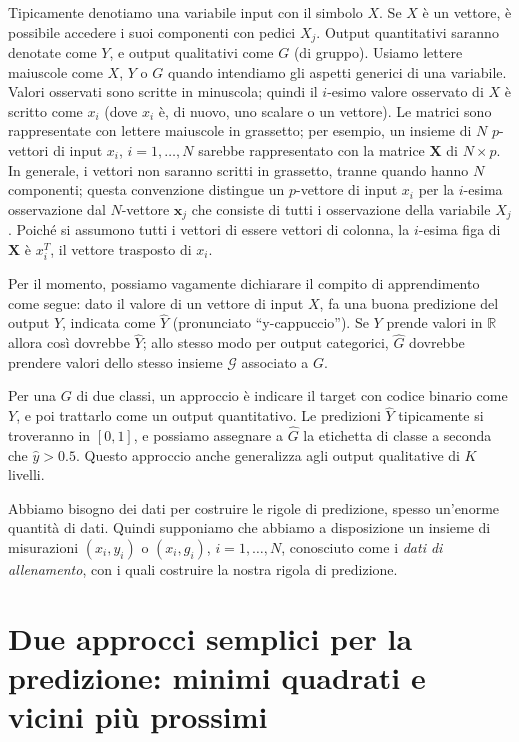 \documentclass[11pt,openany]{book}
\begin{document}
Tipicamente denotiamo una variabile input con il simbolo $X$. Se $X$ è un vettore, è possibile accedere i suoi componenti con pedici $X_j$. Output quantitativi saranno denotate come $Y$, e output qualitativi come $G$ (di gruppo). Usiamo lettere maiuscole come $X$, $Y$ o $G$ quando intendiamo gli aspetti generici di una variabile. Valori osservati sono scritte in minuscola; quindi il $i$-esimo valore osservato di $X$ è scritto come $x_i$ (dove $x_i$ è, di nuovo, uno scalare o un vettore). Le matrici sono rappresentate con lettere maiuscole in grassetto; per esempio, un insieme di $N$ $p$-vettori di input $x_i$, $i = 1, \dots, N$ sarebbe rappresentato con la matrice $\mathbf{X}$ di $N \times p$. In generale, i vettori non saranno scritti in grassetto, tranne quando hanno $N$ componenti; questa convenzione distingue un $p$-vettore di input $x_i$ per la $i$-esima osservazione dal $N$-vettore $\mathbf{x}_j$ che consiste di tutti i osservazione della variabile $X_j$. Poiché si assumono tutti i vettori di essere vettori di colonna, la $i$-esima figa di $\mathbf{X}$ è $x_i^T$, il vettore trasposto di $x_i$.

Per il momento, possiamo vagamente dichiarare il compito di apprendimento come segue: dato il valore di un vettore di input $X$, fa una buona predizione del output $Y$, indicata come $\hat{Y}$ (pronunciato ``y-cappuccio''). Se $Y$ prende valori in $\mathbb{R}$ allora così dovrebbe $\hat{Y}$; allo stesso modo per output categorici, $\hat{G}$ dovrebbe prendere valori dello stesso insieme $\mathcal{G}$ associato a $G$.

Per una $G$ di due classi, un approccio è indicare il target con codice binario come $Y$, e poi trattarlo come un output quantitativo. Le predizioni $\hat{Y}$ tipicamente si troveranno in $[0, 1]$, e possiamo assegnare a $\hat{G}$ la etichetta di classe a seconda che $\hat{y} > 0.5$. Questo approccio anche generalizza agli output qualitative di $K$ livelli.

Abbiamo bisogno dei dati per costruire le rigole di predizione, spesso un'enorme quantità di dati. Quindi supponiamo che abbiamo a disposizione un insieme di misurazioni $(x_i, y_i)$ o $(x_i, g_i)$, $i = 1, \dots, N$, conosciuto come i {\it dati di allenamento}, con i quali costruire la nostra rigola di predizione.

\section{Due approcci semplici per la predizione: minimi quadrati e vicini più prossimi}
\end{document}
